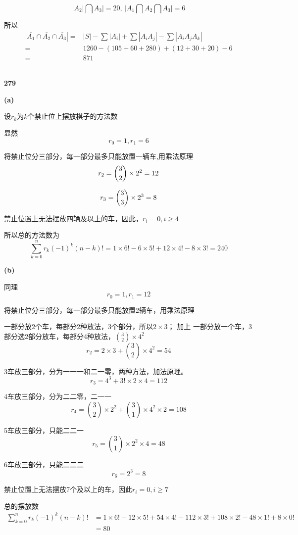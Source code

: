\documentclass[UTF8]{ctexart}
\begin{document}
$$|A_2|\bigcap A_3|=20,\  |A_1\bigcap A_2 \bigcap A_3|=6$$

所以
\begin{equation}
  \nonumber
  \begin{aligned}
    |\overline{A_1} \cap \overline{A_2} \cap \overline{A_3}| =& |S| - \sum |A_i| + \sum |A_iA_j| - \sum|A_iA_jA_k| \\
    =& 1260 - (105+60+280) +(12+30+20) - 6 \\
    =& 871
    \end{aligned}
\end{equation}


~\\
\noindent\textbf{279}

\textbf{(a)  }

设$r_k$为$k$个禁止位上摆放棋子的方法数

显然$$r_0=1,     r_1=6$$

将禁止位分三部分，每一部分最多只能放置一辆车,用乘法原理
$$r_2= \dbinom{3}{2} \times 2^2 = 12$$

$$r_3 = \dbinom{3}{3}\times 2^3 = 8$$

禁止位置上无法摆放四辆及以上的车，因此，$r_i = 0, i \ge 4$

所以总的方法数为
$$\sum_{k=0}^{n} r_k (-1)^k (n-k)! = 1 \times 6! - 6 \times 5! + 12 \times 4! - 8 \times 3! = 240$$

\newpage
\textbf{(b)  }

同理$$r_0=1,     r_1=12$$

将禁止位分三部分，每一部分最多只能放置2辆车，用乘法原理

一部分放2个车，每部分2种放法，3个部分，所以$2\times 3$；
加上 一部分放一个车，3部分选2部分放车，每部分4种放法，${3\choose 2}\times 4^2$
$$
r_2=2\times 3 +{3\choose 2}\times{4^2}=54
$$

3车放三部分，分为一一一和二一零，两种方法，加法原理。
$$
r_3=4^3+3!\times 2 \times 4=112
$$

4车放三部分，分为二二零，二一一
$$
r_4={3\choose 2}\times 2^2 + {3\choose 1}\times 4^2 \times 2=108
$$

5车放三部分，只能二二一
$$
r_5={3\choose 1}\times 2^2 \times 4=48
$$

6车放三部分，只能二二二
$$
r_6=2^3=8
$$

禁止位置上无法摆放7个及以上的车，因此$r_i = 0, i \ge 7$

总的摆放数
\begin{equation}
  \nonumber
  \begin{split}
\sum_{k=0}^{n} r_k (-1)^k (n-k)!&=
1 \times 6! - 12 \times 5! + 54 \times 4! 
- 112 \times 3! + 108 \times 2! - 48 
\times 1! + 8 \times 0!\\
&= 80
  \end{split}
\end{equation}
\end{document}
